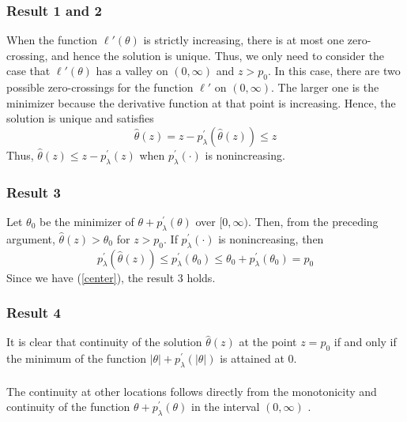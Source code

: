 \documentclass{beamer}
\begin{document}
\begin{frame}
	\frametitle{Result 1 and 2}
  When the function
$\ell'(\theta)$ is strictly increasing, there is at most one zero-crossing,
and hence the solution is unique.
Thus, we only need to consider the
case that $\ell'(\theta)$ has a valley on $\left( 0,\infty \right )$ and $z > p_0$. In this case, there
are two possible zero-crossings for the function $\ell'$ on $\left( 0,\infty \right )$. The
larger one is the minimizer because the derivative function at that
point is increasing. Hence, the solution is unique and satisfies
\begin{equation}
\hat{\theta}(z)=z-p_{\lambda}^{\prime}(\hat{\theta}(z)) \leq z 
\label{center}
\end{equation}
Thus, $\hat{\theta}(z) \leq z-p_{\lambda}^{\prime}(z) $ when $p_{\lambda}^{\prime}(\cdot) $ is nonincreasing. 
\end{frame}
\begin{frame}
  \frametitle{Result 3}
  Let $\theta_0$ be the
minimizer of $\theta+p_{\lambda}^{\prime}(\theta) $ over $[0, \infty)$. Then, from the preceding argument,
$\hat{\theta}(z)>\theta_{0} $ for $z > p_0$. If $p_{\lambda}^{\prime}(\cdot) $ is nonincreasing, then
\[ p_{\lambda}^{\prime}(\hat{\theta}(z)) \leq p_{\lambda}^{\prime}\left(\theta_{0}\right) \leq \theta_{0}+p_{\lambda}^{\prime}\left(\theta_{0}\right)=p_{0} \]
Since we have (\ref{center}), the result 3 holds.
\end{frame}
\begin{frame}
  \frametitle{Result 4}
  It is clear that continuity of the solution $\hat{\theta}(z)$ at the point $ z=p_{0} $
  if and only if the minimum of the function $|\theta|+p_{\lambda}^{\prime}(|\theta|)$ is attained at $0$.
  ~\\
  ~\\
  The continuity at other locations follows directly from the monotonicity and continuity of the function 
  $\theta+   p_{\lambda}^{\prime}(\theta)$  in the interval  $(0, \infty)$ .
\end{frame}
\end{document}

